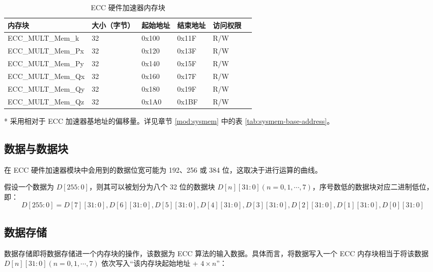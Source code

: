 \documentclass[main\_\_CN.tex]{subfiles}
\begin{document}
\begin{table}[H]
    \centering
    \caption{ECC 硬件加速器内存块} \label{tab:ecc-memory}
    \begin{threeparttable}
    \begin{tabular}{ | l | l | l | l | l | l | }
    \hline
        \rowcolor{lightgray}
        \textbf{内存块} & \textbf{大小（字节）}  &  \textbf{起始地址}\tnote{*} &  \textbf{结束地址} \tnote{*} & \textbf{访问权限}   \\ \hline
        ECC\_MULT\_Mem\_k    & 32  & 0x100 & 0x11F & R/W \\ \hline
        ECC\_MULT\_Mem\_Px   & 32  & 0x120 & 0x13F & R/W \\ \hline
        ECC\_MULT\_Mem\_Py   & 32  & 0x140 & 0x15F & R/W \\ \hline
        ECC\_MULT\_Mem\_Qx   & 32  & 0x160 & 0x17F & R/W \\ \hline
        ECC\_MULT\_Mem\_Qy   & 32  & 0x180 & 0x19F & R/W \\ \hline
        ECC\_MULT\_Mem\_Qz   & 32  & 0x1A0 & 0x1BF & R/W \\ \hline
    \end{tabular}
    \begin{tablenotes}
        \item[*] 采用相对于 ECC 加速器基地址的偏移量。详见章节 \ref{mod:sysmem} \textit{} 中的表 \ref{tab:sysmem-base-address}。
    \end{tablenotes}
    \end{threeparttable}
\end{table}

\subsection{数据与数据块}

在 ECC 硬件加速器模块中会用到的数据位宽可能为 192、256 或 384 位，这取决于进行运算的曲线。

假设一个数据为 $D[255:0]$，则其可以被划分为八个 32 位的数据块 $D[n][31:0](n=0,1,\cdots,7)$，序号数低的数据块对应二进制低位，即：
\[
D[255:0] = {D[7][31:0],D[6][31:0],D[5][31:0],
D[4][31:0],D[3][31:0],D[2][31:0],D[1][31:0],D[0][31:0]}
\]

\subsection{数据存储}

数据存储即将数据存储进一个内存块的操作，该数据为 ECC 算法的输入数据。具体而言，将数据写入一个 ECC 内存块相当于将该数据 $D[n][31:0] (n=0, 1, \cdots, 7)$ 依次写入“该内存块起始地址 + $4 \times n$”：
\end{document}
